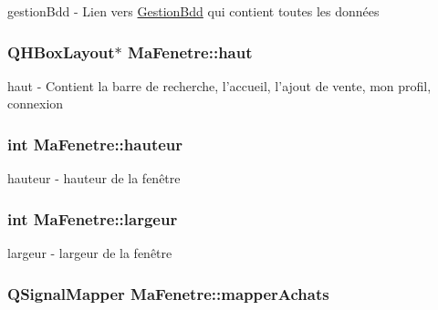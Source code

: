 gestion\-Bdd -\/ Lien vers \hyperlink{class_gestion_bdd}{Gestion\-Bdd} qui contient toutes les données 

\hypertarget{class_ma_fenetre_acd485d3f85c155925df773f028f9e537}{
\subsubsection[{haut}]{\setlength{\rightskip}{0pt plus 5cm}Q\-H\-Box\-Layout$\ast$ Ma\-Fenetre\-::haut\hspace{0.3cm}{\ttfamily [protected]}}}\label{class_ma_fenetre_acd485d3f85c155925df773f028f9e537}


haut -\/ Contient la barre de recherche, l'accueil, l'ajout de vente, mon profil, connexion 

\hypertarget{class_ma_fenetre_ae1a802d46705239d08d3bf06cd99b802}{
\subsubsection[{hauteur}]{\setlength{\rightskip}{0pt plus 5cm}int Ma\-Fenetre\-::hauteur\hspace{0.3cm}{\ttfamily [protected]}}}\label{class_ma_fenetre_ae1a802d46705239d08d3bf06cd99b802}


hauteur -\/ hauteur de la fenêtre 

\hypertarget{class_ma_fenetre_abe37db89fd8895cc34ccc0f5cda67aaf}{
\subsubsection[{largeur}]{\setlength{\rightskip}{0pt plus 5cm}int Ma\-Fenetre\-::largeur\hspace{0.3cm}{\ttfamily [protected]}}}\label{class_ma_fenetre_abe37db89fd8895cc34ccc0f5cda67aaf}


largeur -\/ largeur de la fenêtre 

\hypertarget{class_ma_fenetre_aec38227203ed7fa15ad565077697d661}{
\subsubsection[{mapper\-Achats}]{\setlength{\rightskip}{0pt plus 5cm}Q\-Signal\-Mapper Ma\-Fenetre\-::mapper\-Achats\hspace{0.3cm}{\ttfamily [protected]}}}\label{class_ma_fenetre_aec38227203ed7fa15ad565077697d661}


